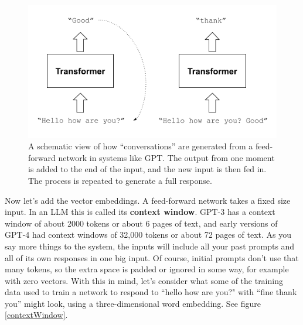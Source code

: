 
\begin{figure}[h]
\centering
\includegraphics[scale=.7]{./images/gptRecursedInputs.png}
\caption[Jeff Yoshimi]{A schematic view of how ``conversations'' are generated from a feed-forward network in systems like GPT. The output from one moment is added to the end of the input, and the new input is then fed in. The process is repeated to generate a full response.}
\label{gptRecursedInputs}
\end{figure}

Now let's add the vector embeddings. A feed-forward network takes a fixed size input.  In an LLM this is called its \textbf{context window}. GPT-3 has a context window of about 2000 tokens or about 6 pages of text, and early versions of GPT-4 had context windows of 32,000 tokens or about 72 pages of text.  As you say more things to the system, the inputs will include all your past prompts and all of its own responses in one big input.  Of course, initial prompts don't use that many tokens, so the extra space is padded or ignored in some way, for example with zero vectors. With this in mind, let's consider what some of the training data used to train a network to respond to ``hello how are you?" with ``fine thank you'' might look, using a three-dimensional word embedding. See figure \ref{contextWindow}. 

